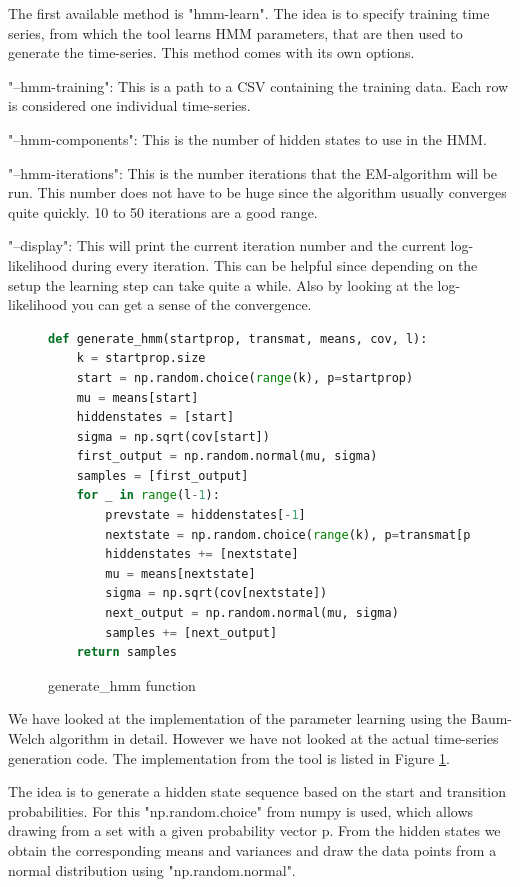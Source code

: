 The first available method is "hmm-learn". The idea is to specify training time series, from which the tool learns HMM parameters, that are then used to generate the time-series. This method comes with its own options. 

"--hmm-training": This is a path to a CSV containing the training data. Each row is considered one individual time-series. 

"--hmm-components": This is the number of hidden states to use in the HMM. 

"--hmm-iterations": This is the number iterations that the EM-algorithm will be run. This number does not have to be huge since the algorithm usually converges quite quickly. 10 to 50 iterations are a good range. 

"--display": This will print the current iteration number and the current log-likelihood during every iteration. This can be helpful since depending on the setup the learning step can take quite a while. Also by looking at the log-likelihood you can get a sense of the convergence. 

\begin{figure}
\begin{singlespace}
\begin{lstlisting}[language=Python]
def generate_hmm(startprop, transmat, means, cov, l):
    k = startprop.size
    start = np.random.choice(range(k), p=startprop)
    mu = means[start]
    hiddenstates = [start]
    sigma = np.sqrt(cov[start])
    first_output = np.random.normal(mu, sigma)
    samples = [first_output]
    for _ in range(l-1):
        prevstate = hiddenstates[-1]
        nextstate = np.random.choice(range(k), p=transmat[prevstate])
        hiddenstates += [nextstate]
        mu = means[nextstate]
        sigma = np.sqrt(cov[nextstate])
        next_output = np.random.normal(mu, sigma)
        samples += [next_output]
    return samples
\end{lstlisting}
\end{singlespace}
\caption{generate\_hmm function}    
\label{fig:hmm-generate}
\end{figure}

We have looked at the implementation of the parameter learning using the Baum-Welch algorithm in detail. However we have not looked at the actual time-series generation code. The implementation from the tool is listed in Figure \ref{fig:hmm-generate}. 

The idea is to generate a hidden state sequence based on the start and transition probabilities. For this "np.random.choice" from numpy is used, which allows drawing from a set with a given probability vector p. From the hidden states we obtain the corresponding means and variances and draw the data points from a normal distribution using "np.random.normal". 


